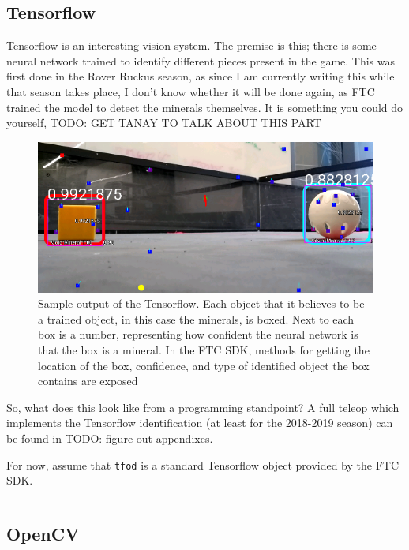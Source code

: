 \documentclass[../main.tex]{subfiles}
\begin{document}
\subsection{Tensorflow}
Tensorflow is an interesting vision system. The premise is this; there is some neural network trained to identify different pieces present in the game. This was first done in the Rover Ruckus season, as since I am currently writing this while that season takes place, I don't know whether it will be done again, as FTC trained the model to detect the minerals themselves. It is something you could do yourself, TODO: GET TANAY TO TALK ABOUT THIS PART
\begin{figure}[H]
    \includegraphics[width=400pt]{sections/vision/images/tensorflowOutput.png}
    \caption{Sample output of the Tensorflow. Each object that it believes to be a trained object, in this case the minerals, is boxed. Next to each box is a number, representing how confident the neural network is that the box is a mineral. In the FTC SDK, methods for getting the location of the box, confidence, and type of identified object the box contains are exposed}
\end{figure}

So, what does this look like from a programming standpoint? A full teleop which implements the Tensorflow identification (at least for the 2018-2019 season) can be found in TODO: figure out appendixes.

For now, assume that \verb|tfod| is a standard Tensorflow object provided by the FTC SDK.

\begin{lstlisting}[language=Java]
\end{lstlisting}
\subsection{OpenCV}
\end{document}
